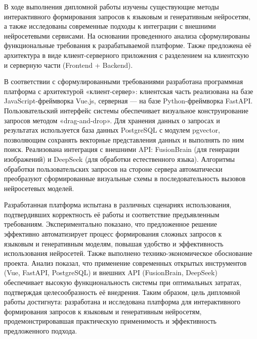 
В ходе выполнения дипломной работы изучены существующие методы интерактивного формирования запросов к языковым и генеративным нейросетям, а также исследованы современные подходы к интеграции с внешними нейросетевыми сервисами. На основании проведенного анализа сформулированы функциональные требования к разрабатываемой платформе. Также предложена её архитектура в виде клиент-серверного приложения с разделением на клиентскую и серверную части (Frontend + Backend).

В соответствии с сформулированными требованиями разработана программная платформа с архитектурой «клиент-сервер»: клиентская часть реализована на базе JavaScript-фреймворка Vue.js, серверная — на базе Python-фреймворка FastAPI. Пользовательский интерфейс системы обеспечивает визуальное конструирование запросов методом «drag-and-drop». Для хранения данных о запросах и результатах используется база данных PostgreSQL с модулем pgvector, позволяющим сохранять векторные представления данных и выполнять по ним поиск. Реализована интеграция с внешними API: FusionBrain (для генерации изображений) и DeepSeek (для обработки естественного языка). Алгоритмы обработки пользовательских запросов на стороне сервера автоматически преобразуют сформированные визуальные схемы в последовательность вызовов нейросетевых моделей.

Разработанная платформа испытана в различных сценариях использования, подтвердивших корректность её работы и соответствие предъявленным требованиям. Экспериментально показано, что предложенное решение эффективно автоматизирует процесс формирования сложных запросов к языковым и генеративным моделям, повышая удобство и эффективность использования нейросетей. Также выполнено технико-экономическое обоснование проекта. Анализ показал, что применение современных открытых инструментов (Vue, FastAPI, PostgreSQL) и внешних API (FusionBrain, DeepSeek) обеспечивает высокую функциональность системы при оптимальных затратах, подтверждая целесообразность её внедрения. Таким образом, цель дипломной работы достигнута: разработана и исследована платформа для интерактивного формирования запросов к языковым и генеративным нейросетям, продемонстрировавшая практическую применимость и эффективность предложенного подхода.